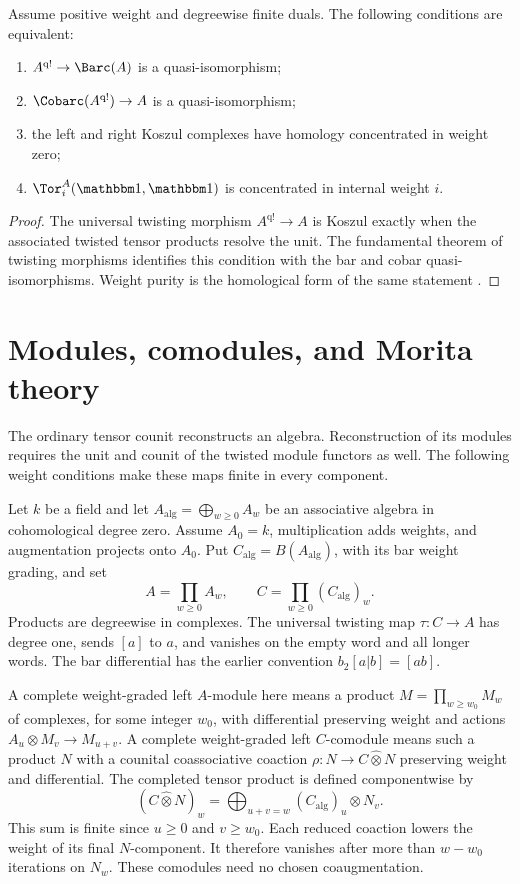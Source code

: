 \begin{theorem}
Assume positive weight and degreewise finite duals. The following conditions are equivalent:
\begin{enumerate}
\item $A^{\mathrm{q!}}\to\Barc(A)$ is a quasi-isomorphism;
\item $\Cobarc(A^{\mathrm{q!}})\to A$ is a quasi-isomorphism;
\item the left and right Koszul complexes have homology concentrated in weight zero;
\item $\Tor_i^A(\mathbbm1,\mathbbm1)$ is concentrated in internal weight $i$.
\end{enumerate}
\end{theorem}
\begin{proof}
The universal twisting morphism $A^{\mathrm{q!}}\to A$ is Koszul exactly when the associated twisted tensor products resolve the unit. The fundamental theorem of twisting morphisms identifies this condition with the bar and cobar quasi-isomorphisms. Weight purity is the homological form of the same statement \cite{Priddy,LV}.
\end{proof}

\chapter{Modules, comodules, and Morita theory}
The ordinary tensor counit reconstructs an algebra. Reconstruction of its
modules requires the unit and counit of the twisted module functors as well.
The following weight conditions make these maps finite in every component.

Let $k$ be a field and let $A_{\mathrm{alg}}=\bigoplus_{w\ge0}A_w$
be an associative algebra in cohomological degree zero.
Assume $A_0=k$, multiplication adds weights, and augmentation projects onto $A_0$.
Put $C_{\mathrm{alg}}=B(A_{\mathrm{alg}})$, with its bar weight grading, and set
\[
 A=\prod_{w\ge0}A_w,\qquad C=\prod_{w\ge0}(C_{\mathrm{alg}})_w.
\]
Products are degreewise in complexes.
The universal twisting map $\tau:C\to A$ has degree one,
sends $[a]$ to $a$, and vanishes on the empty word and all longer words.
The bar differential has the earlier convention $b_2[ a|b]=[ab]$.

A complete weight-graded left $A$-module here means a product
$M=\prod_{w\ge w_0}M_w$ of complexes, for some integer $w_0$,
with differential preserving weight and actions $A_u\otimes M_v\to M_{u+v}$.
A complete weight-graded left $C$-comodule means such a product $N$
with a counital coassociative coaction
$\rho:N\to C\widehat\otimes N$ preserving weight and differential.
The completed tensor product is defined componentwise by
\[
 (C\widehat\otimes N)_w
 =\bigoplus_{u+v=w}(C_{\mathrm{alg}})_u\otimes N_v.
\]
This sum is finite since $u\ge0$ and $v\ge w_0$.
Each reduced coaction lowers the weight of its final $N$-component.
It therefore vanishes after more than $w-w_0$ iterations on $N_w$.
These comodules need no chosen coaugmentation.

